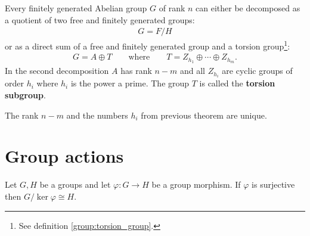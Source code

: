     \begin{theorem}\label{group:theorem:free_group}
        Every finitely generated Abelian group $G$ of rank $n$ can either be decomposed as a quotient of two free and finitely generated groups:
        \begin{gather}
            G = F/H
        \end{gather}
        or as a direct sum of a free and finitely generated group and a torsion group\footnote{See definition \ref{group:torsion_group}.}:
        \begin{gather}
            G = A\oplus T\qquad\text{where}\qquad T = Z_{h_1}\oplus\cdots\oplus Z_{h_m}.
        \end{gather}
        In the second decomposition $A$ has rank $n-m$ and all $Z_{h_i}$ are cyclic groups of order $h_i$ where $h_i$ is the power a prime. The group $T$ is called the \textbf{torsion subgroup}.
    \end{theorem}
    \begin{property}[Uniqueness]
        The rank $n-m$ and the numbers $h_i$ from previous theorem are unique.
    \end{property}

\section{Group actions}\label{section:group_actions}



    \begin{theorem}\label{group:theorem:first_isomorphism_theorem}
        Let $G, H$ be a groups and let $\varphi:G\rightarrow H$ be a group morphism. If $\varphi$ is surjective then $G/\ker\varphi\cong H$.
    \end{theorem}

